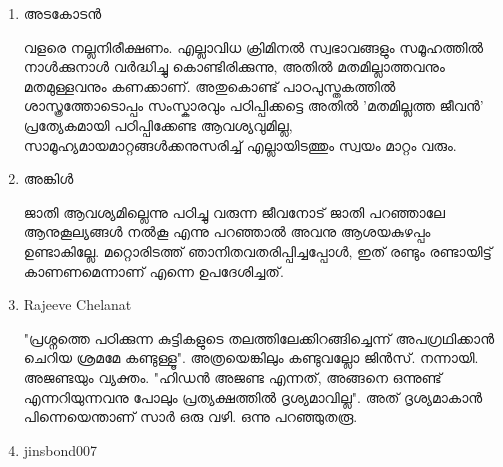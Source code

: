 \begin{enumerate}

\item{അടകോടന്‍}

വളരെ നല്ലനിരീക്ഷണം. എല്ലാവിധ ക്രിമിനല്‍ സ്വഭാവങ്ങളും സമൂഹത്തില്‍ നാള്‍ക്കുനാള്‍ വര്‍ദ്ധിച്ചു കൊണ്ടിരിക്കുന്നു, 
അതില്‍ മതമില്ലാത്തവനും മതമുള്ളവനും കണക്കാണ്. അതുകൊണ്ട് പാഠപുസ്തകത്തില്‍ ശാസ്ത്രത്തോടൊപ്പം സംസ്കാരവും 
പഠിപ്പിക്കട്ടെ അതില്‍ 'മതമില്ലത്ത ജീവന്‍' പ്രത്യേകമായി പഠിപ്പിക്കേണ്ട ആവശ്യവുമില്ല, സാമൂഹ്യമായമാറ്റങ്ങള്‍ക്കനുസരിച്ച് 
എല്ലായിടത്തും സ്വയം മാറ്റം വരും.

\item{അങ്കിള്‍}

ജാതി ആവശ്യമില്ലെന്നു പഠിച്ചു വരുന്ന ജീവനോട് ജാതി പറഞ്ഞാലേ ആനുകൂല്യങ്ങള്‍ നല്‍കൂ എന്നു പറഞ്ഞാല്‍ അവനു 
ആശയകുഴപ്പം ഉണ്ടാകില്ലേ. മറ്റൊരിടത്ത് ഞാനിതവതരിപ്പിച്ചപ്പോള്‍, ഇത് രണ്ടും രണ്ടായിട്ട് കാണണമെന്നാണ് എന്നെ 
ഉപദേശിച്ചത്.

\item{Rajeeve Chelanat}

"പ്രശ്നത്തെ പഠിക്കുന്ന കുട്ടികളുടെ തലത്തിലേക്കിറങ്ങിച്ചെന്ന് അപഗ്രഥിക്കാന്‍ ചെറിയ ശ്രമമേ കണ്ടുള്ളൂ". അത്രയെങ്കിലും 
കണ്ടുവല്ലോ ജിന്‍സ്. നന്നായി. അജണ്ടയും വ്യക്തം. "ഹിഡന്‍ അജണ്ട എന്നത്, അങ്ങനെ ഒന്നുണ്ട് എന്നറിയുന്നവനു 
പോലും പ്രത്യക്ഷത്തില്‍ ദൃശ്യമാവില്ല". അത് ദൃശ്യമാകാന്‍ പിന്നെയെന്താണ് സാര്‍ ഒരു വഴി. ഒന്നു പറഞ്ഞുതരൂ.

\item{jinsbond007}


\end{enumerate}
